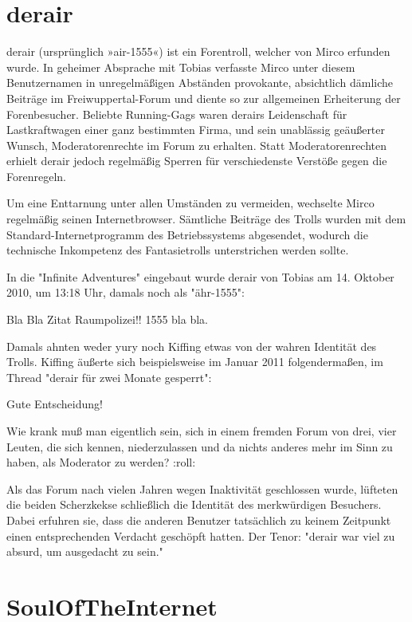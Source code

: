 \section{derair}

derair (ursprünglich »air-1555«) ist ein Forentroll, welcher von Mirco erfunden wurde. In geheimer Absprache mit Tobias verfasste Mirco unter diesem Benutzernamen in unregelmäßigen Abständen provokante, absichtlich dämliche Beiträge im Freiwuppertal-Forum und diente so zur allgemeinen Erheiterung der Forenbesucher. Beliebte Running-Gags waren derairs Leidenschaft für Lastkraftwagen einer ganz bestimmten Firma, und sein unablässig geäußerter Wunsch, Moderatorenrechte im Forum zu erhalten. Statt Moderatorenrechten erhielt derair jedoch regelmäßig Sperren für verschiedenste Verstöße gegen die Forenregeln.

Um eine Enttarnung unter allen Umständen zu vermeiden, wechselte Mirco regelmäßig seinen Internetbrowser. Sämtliche Beiträge des Trolls wurden mit dem Standard-Internetprogramm des Betriebssystems abgesendet, wodurch die technische Inkompetenz des Fantasietrolls unterstrichen werden sollte.

In die "Infinite Adventures" eingebaut wurde derair von Tobias am 14. Oktober 2010, um 13:18 Uhr, damals noch als "ähr-1555":

\begin{itshape}
Bla Bla Zitat Raumpolizei!! 1555 bla bla.
\end{itshape}

Damals ahnten weder yury noch Kiffing etwas von der wahren Identität des Trolls. Kiffing äußerte sich beispielsweise im Januar 2011 folgendermaßen, im Thread "derair für zwei Monate gesperrt":

\begin{itshape}
Gute Entscheidung!

Wie krank muß man eigentlich sein, sich in einem fremden Forum von drei, vier Leuten, die sich kennen, niederzulassen und da nichts anderes mehr im Sinn zu haben, als Moderator zu werden? :roll:
\end{itshape}

Als das Forum nach vielen Jahren wegen Inaktivität geschlossen wurde, lüfteten die beiden Scherzkekse schließlich die Identität des merkwürdigen Besuchers. Dabei erfuhren sie, dass die anderen Benutzer tatsächlich zu keinem Zeitpunkt einen entsprechenden Verdacht geschöpft hatten. Der Tenor: "derair war viel zu absurd, um ausgedacht zu sein."

\section{SoulOfTheInternet}

